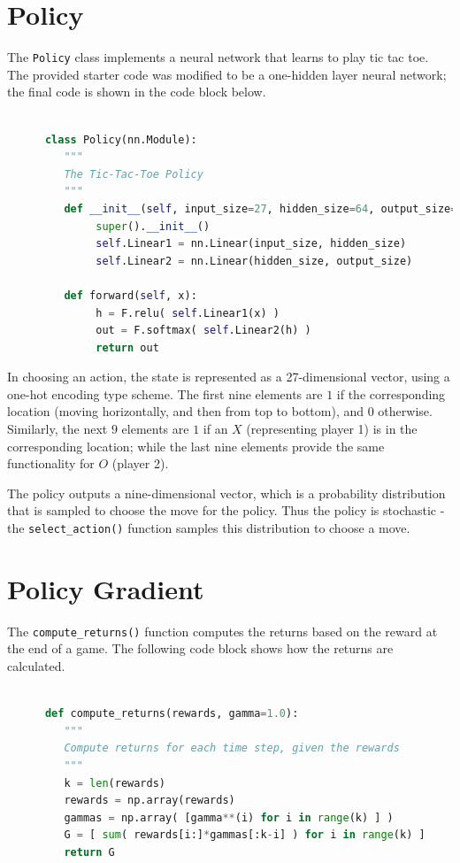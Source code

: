 \documentclass{article}
\begin{document}
   \section{Policy}
   The \texttt{Policy} class implements a neural network that learns to play tic tac toe. The provided
   starter code was modified to be a one-hidden layer neural network; the final code is shown in the
   code block below.
   \begin{lstlisting}[language=Python, label={PolicyClass}]

      class Policy(nn.Module):
         """
         The Tic-Tac-Toe Policy
         """
         def __init__(self, input_size=27, hidden_size=64, output_size=9):
              super().__init__()
              self.Linear1 = nn.Linear(input_size, hidden_size)
              self.Linear2 = nn.Linear(hidden_size, output_size)

         def forward(self, x):
              h = F.relu( self.Linear1(x) )
              out = F.softmax( self.Linear2(h) )
              return out
   \end{lstlisting}

   In choosing an action, the state is represented as a 27-dimensional vector, using a one-hot encoding
   type scheme. The first nine elements are $1$ if the corresponding location (moving horizontally, and then
   from top to bottom), and $0$ otherwise. Similarly, the next $9$ elements are $1$ if an $X$ (representing
   player 1) is in the corresponding location; while the last nine elements provide the same functionality
   for $O$ (player 2).

   The policy outputs a nine-dimensional vector, which is a probability distribution that is sampled to choose
   the move for the policy. Thus the policy is stochastic - the \texttt{select\_action()} function samples this
   distribution to choose a move.


   \section{Policy Gradient}
   The \texttt{compute\_returns()} function computes the returns based on the reward at the end of a game.
   The following code block shows how the returns are calculated.
   \begin{lstlisting}[language=Python, label={returns}]

      def compute_returns(rewards, gamma=1.0):
         """
         Compute returns for each time step, given the rewards
         """
         k = len(rewards)
         rewards = np.array(rewards)
         gammas = np.array( [gamma**(i) for i in range(k) ] )
         G = [ sum( rewards[i:]*gammas[:k-i] ) for i in range(k) ]
         return G
   \end{lstlisting}
\end{document}
